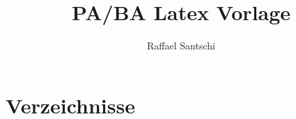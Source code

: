 %
%





%



\title{PA/BA Latex Vorlage}
\author{Raffael Santschi}



\setcounter{page}{1}
%



\tableofcontents
\newpage








 




\chapter{Verzeichnisse}\label{chap.verzeichnisse}
% 
\label{cha:literaturverzeichnis}
 
 \listoffigures
 \listoftables
 
 




